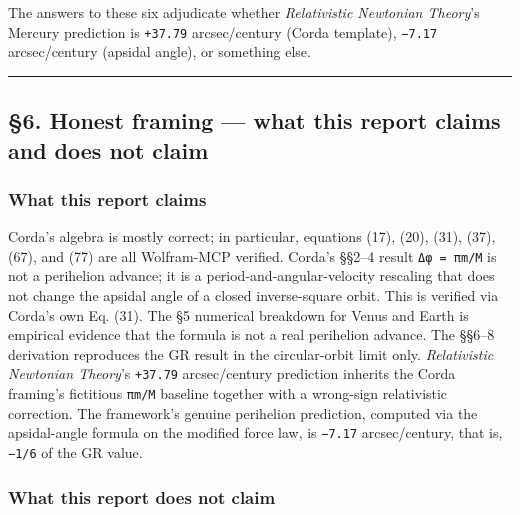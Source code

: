 \documentclass[
  11pt,
]{article}
\begin{document}
The answers to these six adjudicate whether \emph{Relativistic Newtonian
Theory}'s Mercury prediction is \texttt{+37.79} arcsec/century (Corda
template), \texttt{−7.17} arcsec/century (apsidal angle), or something
else.

\begin{center}\rule{0.5\linewidth}{0.5pt}\end{center}

\hypertarget{honest-framing-what-this-report-claims-and-does-not-claim}{%
\subsection{§6. Honest framing --- what this report claims and does not
claim}\label{honest-framing-what-this-report-claims-and-does-not-claim}}

\hypertarget{what-this-report-claims}{%
\subsubsection{What this report claims}\label{what-this-report-claims}}

Corda's algebra is mostly correct; in particular, equations (17), (20),
(31), (37), (67), and (77) are all Wolfram-MCP verified. Corda's §§2--4
result \texttt{Δφ\ =\ πm/M} is not a perihelion advance; it is a
period-and-angular-velocity rescaling that does not change the apsidal
angle of a closed inverse-square orbit. This is verified via Corda's own
Eq. (31). The §5 numerical breakdown for Venus and Earth is empirical
evidence that the formula is not a real perihelion advance. The §§6--8
derivation reproduces the GR result in the circular-orbit limit only.
\emph{Relativistic Newtonian Theory}'s \texttt{+37.79} arcsec/century
prediction inherits the Corda framing's fictitious \texttt{πm/M}
baseline together with a wrong-sign relativistic correction. The
framework's genuine perihelion prediction, computed via the
apsidal-angle formula on the modified force law, is \texttt{−7.17}
arcsec/century, that is, \texttt{−1/6} of the GR value.

\hypertarget{what-this-report-does-not-claim}{%
\subsubsection{What this report does not
claim}\label{what-this-report-does-not-claim}}
\end{document}
